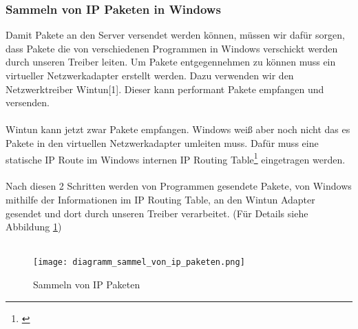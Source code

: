 \subsubsection{Sammeln von IP Paketen in Windows}
Damit Pakete an den Server versendet werden können, müssen wir dafür sorgen, dass Pakete die von verschiedenen Programmen in Windows verschickt werden durch unseren Treiber leiten. Um Pakete entgegennehmen zu können muss ein virtueller Netzwerkadapter erstellt werden. Dazu verwenden wir den Netzwerktreiber Wintun[1]. Dieser kann performant Pakete empfangen und versenden.
\\\\
Wintun kann jetzt zwar Pakete empfangen. Windows weiß aber noch nicht das es Pakete in den virtuellen Netzwerkadapter umleiten muss. Dafür muss eine statische IP Route im Windows internen IP Routing Table\footnote[1]{\cite[Vgl.][]{2}} eingetragen werden.
\\\\
Nach diesen 2 Schritten werden von Programmen gesendete Pakete, von Windows mithilfe  der Informationen im IP Routing Table, an den Wintun Adapter gesendet und dort durch unseren Treiber verarbeitet. (Für Details siehe Abbildung \ref{driver-collect-packets})
\\\\
\begin{figure}[H]
    \centering
    \texttt{[image: diagramm\_sammel\_von\_ip\_paketen.png]}
    \caption[Sammeln von IP Paketen]{Sammeln von IP Paketen}
    \label{driver-collect-packets}
\end{figure}
\noindent

\newpage

